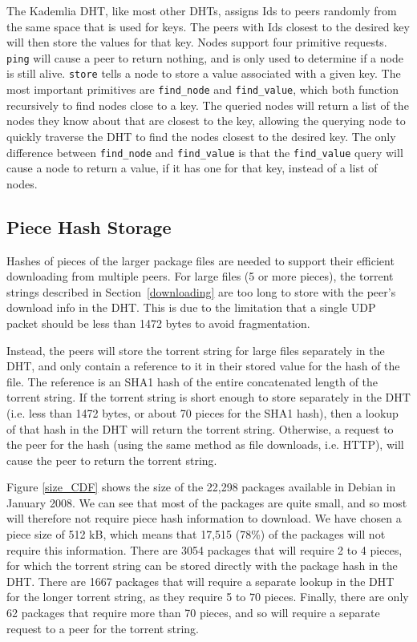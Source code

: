 \documentclass[conference]{IEEEtran}
\begin{document}
The Kademlia DHT, like most other DHTs, assigns Ids to peers randomly from
the same space that is used for keys. The peers with Ids closest to
the desired key will then store the values for that key.
Nodes support four primitive requests.
\texttt{ping} will cause a peer to return nothing, and is only used
to determine if a node is still alive. \texttt{store} tells a
node to store a value associated with a given key. The most
important primitives are \texttt{find\_node} and
\texttt{find\_value}, which both function recursively to find nodes
close to a key. The queried nodes will return a list of the nodes
they know about that are closest to the key, allowing the querying
node to quickly traverse the DHT to find the nodes closest to the
desired key. The only difference between \texttt{find\_node} and \texttt{find\_value} is that the
\texttt{find\_value} query will cause a node to return a value, if
it has one for that key, instead of a list of nodes.

\subsection{Piece Hash Storage}
\label{pieces}

Hashes of pieces of the larger package files are needed to support
their efficient downloading from multiple peers.
For large files (5 or more pieces), the torrent strings described in
Section~\ref{downloading}
are too long to store with the peer's download info in the DHT. This
is due to the limitation that a single UDP packet should be less
than 1472 bytes to avoid fragmentation.

Instead, the peers will store the torrent string for large files
separately in the DHT, and only contain a reference to it in their
stored value for the hash of the file. The reference is an SHA1 hash
of the entire concatenated length of the torrent string. If the
torrent string is short enough to store separately in the DHT (i.e. less than
1472 bytes, or about 70 pieces for the SHA1 hash), then a lookup of
that hash in the DHT will return the torrent string. Otherwise, a
request to the peer for the hash (using the same method as file
downloads, i.e. HTTP), will cause the peer to return the torrent
string.

Figure \ref{size_CDF} shows the size of the 22,298 packages
available in Debian in January 2008. We can see that most of the
packages are quite small, and so most will therefore not require
piece hash information to download. We have chosen a piece
size of 512 kB, which means that 17,515 (78\%) of the packages will
not require this information. There are 3054 packages that will
require 2 to 4 pieces, for which the torrent string can be stored
directly with the package hash in the DHT. There are 1667 packages
that will require a separate lookup in the DHT for the longer
torrent string, as they require 5 to 70 pieces. Finally, there are
only 62 packages that require more than 70 pieces, and so will
require a separate request to a peer for the torrent string.
\end{document}
